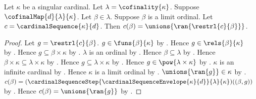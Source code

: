 \begin{proposition}\label{cardinal_sequence_at_limit}
    Let $\kappa$ be a singular cardinal.
    Let $\lambda=\cofinality{\kappa}$.
    Suppose $\cofinalMap{d}{\lambda}{\kappa}$.
    Let $\beta\in\lambda$.
    Suppose $\beta$ is a limit ordinal.
    Let $c=\cardinalSequence{\kappa}{d}$.
    Then $c(\beta)=\unions{\ran{\restrl{c}{\beta}}}$.
\end{proposition}
\begin{proof}
    Let $g=\restrl{c}{\beta}$.
    $g\in\funs{\beta}{\kappa}$
        by .
    Hence $g\in\rels{\beta}{\kappa}$
        by .
    Hence $g\subseteq\beta\times\kappa$ by .
    $\lambda$ is an ordinal
        by .
    Hence $\beta\subseteq\lambda$
        by .
    Hence $\beta\times\kappa\subseteq\lambda\times\kappa$
        by .
    Hence $g\subseteq\lambda\times\kappa$
        by .
    Hence $g\in\pow{\lambda\times\kappa}$ by .
    $\kappa$ is an infinite cardinal by .
    Hence $\kappa$ is a limit ordinal
        by .
    $\unions{\ran{g}}\in\kappa$
        by .
    $c(\beta)=
        (\cardinalSequenceStep{\cardinalSequenceEnvelope{\kappa}{d}}
            {\lambda}{\kappa})((\beta,g))$
        by .
    Hence $c(\beta)=\unions{\ran{g}}$
        by .
\end{proof}


